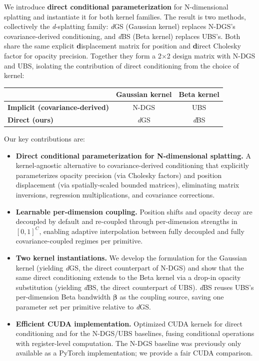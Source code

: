\documentclass{article}
\newcommand{\dgs}{\textit{d}GS\xspace}
\newcommand{\dbs}{\textit{d}BS\xspace}
\newcommand{\dfamily}{\textit{d}-splatting\xspace}
\theoremstyle{plain}
\theoremstyle{definition}
\theoremstyle{remark}
\begin{document}
We introduce \textbf{direct conditional parameterization} for N-dimensional splatting and instantiate it for both kernel families. The result is two methods, collectively the \dfamily{} family: \dgs{} (Gaussian kernel) replaces N-DGS's covariance-derived conditioning, and \dbs{} (Beta kernel) replaces UBS's. Both share the same explicit \textbf{d}isplacement matrix for position and \textbf{d}irect Cholesky factor for opacity precision. Together they form a 2$\times$2 design matrix with N-DGS and UBS, isolating the contribution of direct conditioning from the choice of kernel:

\begin{center}
\small
\begin{tabular}{lcc}
\toprule
 & \textbf{Gaussian kernel} & \textbf{Beta kernel} \\
\midrule
\textbf{Implicit (covariance-derived)} & N-DGS & UBS \\
\textbf{Direct (ours)} & \dgs{} & \dbs{} \\
\bottomrule
\end{tabular}
\end{center}

Our key contributions are:

\begin{itemize}[leftmargin=*]
\item \textbf{Direct conditional parameterization for N-dimensional splatting.} A kernel-agnostic alternative to covariance-derived conditioning that explicitly parameterizes opacity precision (via Cholesky factors) and position displacement (via spatially-scaled bounded matrices), eliminating matrix inversions, regression multiplications, and covariance corrections.

\item \textbf{Learnable per-dimension coupling.} Position shifts and opacity decay are decoupled by default and re-coupled through per-dimension strengths in $[0,1]^C$, enabling adaptive interpolation between fully decoupled and fully covariance-coupled regimes per primitive.

\item \textbf{Two kernel instantiations.} We develop the formulation for the Gaussian kernel (yielding \dgs{}, the direct counterpart of N-DGS) and show that the same direct conditioning extends to the Beta kernel via a drop-in opacity substitution (yielding \dbs{}, the direct counterpart of UBS). \dbs{} reuses UBS's per-dimension Beta bandwidth $\boldsymbol{\beta}$ as the coupling source, saving one parameter set per primitive relative to \dgs{}.

\item \textbf{Efficient CUDA implementation.} Optimized CUDA kernels for direct conditioning and for the N-DGS/UBS baselines, fusing conditional operations with register-level computation. The N-DGS baseline was previously only available as a PyTorch implementation; we provide a fair CUDA comparison.
\end{itemize}
\end{document}
